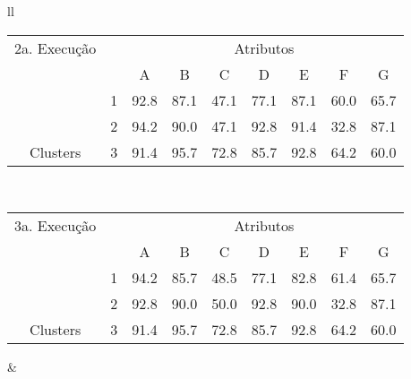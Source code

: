 \begin{table}[!h]
\begin{tabular}{ll}
   
   \small\addtolength{\tabcolsep}{-5pt}
   \begin{tabular}{|cl|c|c|c|c|c|c|c|}
        \hline \hline
             {\tiny 2a. Execução }       &   & \multicolumn{7}{c|}{Atributos}                                               \\ \cline{3-9} 
       \multicolumn{1}{|l}{}                            &   & A    & B & C & D & E & F & G \\ \hline
        \multicolumn{1}{|c|}{}                           & 1 & 92.8 & 87.1   & 47.1      & 77.1 & 87.1 & 60.0   & 65.7   \\ \cline{2-9} 
        \multicolumn{1}{|c|}{}                           & 2 & 94.2 & 90.0   & 47.1      & 92.8 & 91.4 & 32.8  & 87.1  \\ \cline{2-9} 
        \multicolumn{1}{|c|}{\multirow{-3}{*}{Clusters}} & 3 & 91.4 & 95.7   & 72.8      & 85.7 & 92.8 & 64.2  & 60.0  \\ \hline
      \end{tabular}
  \\  [8ex]
 
   \small\addtolength{\tabcolsep}{-5pt}
   \begin{tabular}{|cl|c|c|c|c|c|c|c|}
        \hline \hline
          {\tiny 3a. Execução}     &   & \multicolumn{7}{c|}{Atributos}                                               \\ \cline{3-9} 
       \multicolumn{1}{|l}{}                            &   & A    & B & C & D & E & F & G \\ \hline
        \multicolumn{1}{|c|}{}                           & 1 & 94.2 & 85.7   & 48.5      & 77.1 & 82.8 & 61.4   & 65.7   \\ \cline{2-9} 
        \multicolumn{1}{|c|}{}                           & 2 & 92.8 & 90.0   & 50.0      & 92.8 & 90.0 & 32.8  & 87.1  \\ \cline{2-9} 
        \multicolumn{1}{|c|}{\multirow{-3}{*}{Clusters}} & 3 & 91.4 & 95.7   & 72.8      & 85.7 & 92.8 & 64.2  & 60.0  \\ \hline
   \end{tabular}
    
    &
    

\end{tabular}
\end{table}
